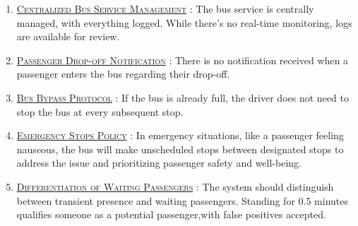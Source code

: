 \begin{enumerate}
    \item \underline{\textsc{Centralized Bus Service Management}} : The bus service is centrally managed, with everything logged. While there's no real-time monitoring, logs are available for review.
    
    \item \underline{\textsc{Passenger Drop-off Notification}} : There is no notification received when a passenger enters the bus regarding their drop-off.
    
    \item \underline{\textsc{Bus Bypass Protocol}} : If the bus is already full, the driver does not need to stop the bus at every subsequent stop.
    
    \item \underline{\textsc{Emergency Stops Policy}} : In emergency situations, like a passenger feeling nauseous, the bus will make unscheduled stops between designated stops to address the issue and prioritizing passenger safety and well-being.
    
    \item \underline{\textsc{Differentiation of Waiting Passengers}} : The system should distinguish between transient presence and waiting passengers. Standing for 0.5 minutes qualifies someone as a potential passenger,with false positives accepted.
\end{enumerate}
